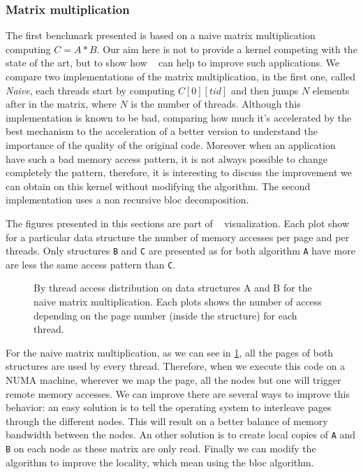 \subsubsection{Matrix multiplication}
\label{sec:exp-mat}

The first benchmark presented is based on a naive matrix multiplication
computing $C=A*B$. Our aim here is not to provide a kernel competing with the
state of the art, but to show how \TABARNAC~ can help to improve such
applications. We compare two implementations of the matrix multiplication, in
the first one, called \emph{Naive}, each threads start by computing
$C[0][tid]$ and then jumps $N$ elements after in the matrix, where $N$ is the
number of threads. Although this implementation is known to be bad, comparing
how much it's accelerated by the best mechanism to the acceleration of a
better version to understand the importance of the quality of the original
code. Moreover when an application have such a bad memory access pattern, it
is not always possible to change completely the pattern, therefore, it is
interesting to discuss the improvement we can obtain on this kernel without
modifying the algorithm. The second implementation uses a non recursive bloc
decomposition.

The figures presented in this sections are part of \TABARNAC~ visualization.
Each plot show for a particular data structure the number of memory accesses
per page and per threads. Only structures \texttt{B} and \texttt{C} are
presented as for both algorithm \texttt{A} have more are less the same access
pattern than \texttt{C}.

\begin{figure}[htb]
    \centering
    \caption{By thread access distribution on data structures A and B for the
        naive matrix multiplication. Each plots shows the number of access
    depending on the page number (inside the structure) for each thread.}
    \label{fig:matrix-naive}
\end{figure}

For the naive matrix multiplication, as we can see in
\ref{fig:matrix-naive}, all the pages of both structures are used by every
thread. Therefore, when we execute this code on a NUMA machine, wherever we
map the page, all the nodes but one will trigger remote memory accesses. We
can improve there are several ways to improve this behavior: an easy solution
is to tell the operating system to interleave pages through the different
nodes. This will result on a better balance of memory bandwidth between the
nodes. An other solution is to create local copies of \texttt{A} and
\texttt{B} on each node as these matrix are only read. Finally we can modify
the algorithm to improve the locality, which mean using the bloc algorithm.

